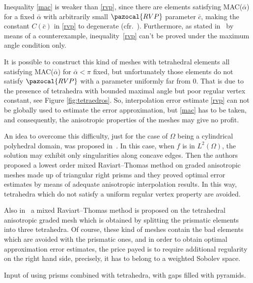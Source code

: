 Inequality \eqref{mac} is weaker than \eqref{rvp}, since there are elements 
satisfying MAC($\bar\alpha$) for a fixed $\bar\alpha$ with arbitrarily 
small $\pazocal{RVP}$ parameter $\bar c$, making the constant $C(\bar c)$ in \eqref{rvp} 
to degenerate  
(cfr.~\cite{aadl}). Furthermore,
as stated 
in~\cite{aadl} by means of a counterexample, 
inequality~\eqref{rvp} can't be proved under the maximum angle condition only. 

It is possible to construct this
kind of meshes with tetrahedral elements all satisfying MAC($\bar\alpha$) for $\bar\alpha<\pi$ fixed, but unfortunately those 
elements do not satisfy $\pazocal{RVP}$ with a parameter uniformly far from $0$. That is 
due to the presence of tetrahedra with bounded 
maximal angle but poor regular vertex constant, see Figure \ref{fig:tetraedros}. So, interpolation error estimate \eqref{rvp} 
can not be globally used to estimate the error approximation, but \eqref{mac} has to be taken, and consequently, 
the anisotropic properties of the meshes may give no profit.  

\tetsTikz

An idea to overcome this difficulty, just for the case of $\Omega$ being a 
cylindrical polyhedral domain, 
was proposed in~\cite{MR1866274}. In  this case, when $f$ is in $L^2(\Omega)$, 
the solution may exhibit only singularities along concave edges.
Then the authors proposed a lowest order mixed Raviart--Thomas method on graded 
anisotropic meshes made up of triangular right prisms and they proved optimal error 
estimates by means of adequate anisotropic interpolation results. 
In this way, tetrahedra which do not satisfy a
uniform regular vertex property are avoided.

Also in~\cite{MR1866274} a mixed Raviart--Thomas method is 
proposed on the tetrahedral 
anisotropic graded mesh which is obtained by splitting the prismatic elements 
into three tetrahedra. Of course, these kind of meshes contain the bad elements 
which are avoided with the prismatic ones, and in order to obtain optimal 
approximation error estimates, the price payed is to require additional regularity 
on the right hand side, precisely, it has to belong to a weighted Sobolev space.

Input of using prisms combined with tetrahedra, with gaps filled with pyramids.

